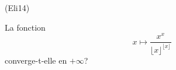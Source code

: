 \begin{tiny}(Eli14)\end{tiny} La fonction
\begin{displaymath}
 x \mapsto \frac{x^x}{\lfloor x \rfloor^{\lfloor x \rfloor}}
\end{displaymath}
 converge-t-elle en $+\infty$?
